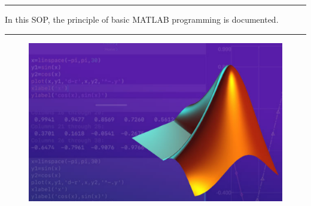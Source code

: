 \documentclass[
11pt, %
a4paper, %
oneside, %
headinclude,footinclude, %
BCOR5mm, %
]{scrartcl}
\renewenvironment{abstract}
 {\quotation\small\noindent\rule{\linewidth}{.5pt}\par\smallskip
  {\centering\bfseries\abstractname\par}\medskip}
 {\par\noindent\rule{\linewidth}{.5pt}\endquotation}
\begin{document}
\begin{abstract}\centering\noindent %
In this SOP, the principle of basic MATLAB programming is documented.
\end{abstract}
\vspace*{0.15in}
\begin{figure}
\centering %
\includegraphics[width=0.7\columnwidth]{Figures/Figure0.png} %
\end{figure}

\makeatletter
{} %
\makeatother

\setcounter{tocdepth}{2} %

\pagebreak
\tableofcontents %
\listoffigures %


\end{document}

